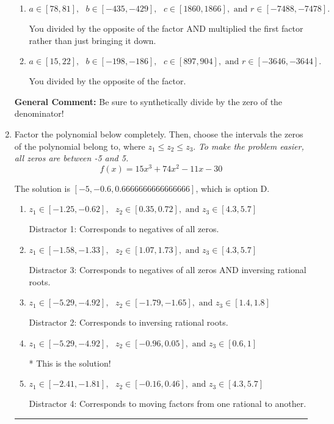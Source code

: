 \documentclass{extbook}[14pt]
\newcommand{\litem}[1]{\item #1

\rule{\textwidth}{0.4pt}}
\begin{document}
\begin{enumerate}
{\begin{enumerate}[label=\Alph*.]
 You multiplied by the synthetic number rather than bringing the first factor down.
\item \( a \in [78, 81], \text{   } b \in [-435, -429], \text{   } c \in [1860, 1866], \text{   and   } r \in [-7488, -7478]. \)

 You divided by the opposite of the factor AND multiplied the first factor rather than just bringing it down.
\item \( a \in [15, 22], \text{   } b \in [-198, -186], \text{   } c \in [897, 904], \text{   and   } r \in [-3646, -3644]. \)

 You divided by the opposite of the factor.
\end{enumerate}

\textbf{General Comment:} Be sure to synthetically divide by the zero of the denominator!
}
\litem{
Factor the polynomial below completely. Then, choose the intervals the zeros of the polynomial belong to, where $z_1 \leq z_2 \leq z_3$. \textit{To make the problem easier, all zeros are between -5 and 5.}
\[ f(x) = 15x^{3} +74 x^{2} -11 x -30 \]

The solution is \( [-5, -0.6, 0.6666666666666666] \), which is option D.\begin{enumerate}[label=\Alph*.]
\item \( z_1 \in [-1.25, -0.62], \text{   }  z_2 \in [0.35, 0.72], \text{   and   } z_3 \in [4.3, 5.7] \)

 Distractor 1: Corresponds to negatives of all zeros.
\item \( z_1 \in [-1.58, -1.33], \text{   }  z_2 \in [1.07, 1.73], \text{   and   } z_3 \in [4.3, 5.7] \)

 Distractor 3: Corresponds to negatives of all zeros AND inversing rational roots.
\item \( z_1 \in [-5.29, -4.92], \text{   }  z_2 \in [-1.79, -1.65], \text{   and   } z_3 \in [1.4, 1.8] \)

 Distractor 2: Corresponds to inversing rational roots.
\item \( z_1 \in [-5.29, -4.92], \text{   }  z_2 \in [-0.96, 0.05], \text{   and   } z_3 \in [0.6, 1] \)

* This is the solution!
\item \( z_1 \in [-2.41, -1.81], \text{   }  z_2 \in [-0.16, 0.46], \text{   and   } z_3 \in [4.3, 5.7] \)

 Distractor 4: Corresponds to moving factors from one rational to another.
\end{enumerate}

}
\end{enumerate}
\end{document}
